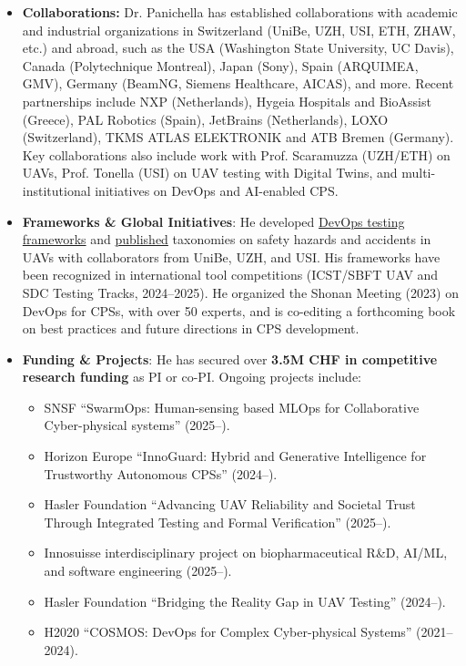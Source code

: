 \documentclass[11pt]{article}
\begin{document}
\begin{itemize}
\vspace{-2.5mm}
\item 
\textbf{Collaborations:} 
Dr. Panichella has established collaborations with academic and industrial organizations in Switzerland (UniBe, UZH, USI, ETH, ZHAW, etc.) and abroad, such as the USA (Washington State University, UC Davis), Canada (Polytechnique Montreal), Japan (Sony), Spain (ARQUIMEA, GMV), Germany (BeamNG, Siemens Healthcare, AICAS), and more. 
Recent partnerships include NXP (Netherlands), Hygeia Hospitals and BioAssist (Greece), PAL Robotics (Spain), JetBrains (Netherlands), LOXO (Switzerland), TKMS ATLAS ELEKTRONIK and ATB Bremen (Germany). 
Key collaborations also include work with Prof. Scaramuzza (UZH/ETH) on UAVs, Prof. Tonella (USI) on UAV testing with Digital Twins, and multi-institutional initiatives on DevOps and AI-enabled CPS.  
\vspace{-2.5mm}
\item   \textbf{Frameworks \& Global Initiatives}:  He developed \href{https://spanichella.github.io/tools.html}{DevOps testing frameworks} and \href{https://spanichella.github.io/publications.html}{published} taxonomies on safety hazards and accidents in UAVs with collaborators from UniBe, UZH, and USI. His frameworks have been recognized in international tool competitions (ICST/SBFT UAV and SDC Testing Tracks, 2024–2025). 
He organized the Shonan Meeting (2023) on DevOps for CPSs, with over 50 experts, and is co-editing a forthcoming book on best practices and future directions in CPS development. 
\vspace{-2.5mm}
\item   \textbf{Funding \& Projects}: He has secured over \textbf{3.5M CHF in competitive research funding} as PI or co-PI. Ongoing projects include:
\begin{itemize}
   \item SNSF “SwarmOps: Human-sensing based MLOps for Collaborative Cyber-physical systems” (2025–).
   \item Horizon Europe “InnoGuard: Hybrid and Generative Intelligence for Trustworthy Autonomous CPSs” (2024–).
   \item Hasler Foundation “Advancing UAV Reliability and Societal Trust Through Integrated Testing and Formal Verification” (2025–).
   \item Innosuisse interdisciplinary project on biopharmaceutical R\&D, AI/ML, and software engineering (2025–).
   \item Hasler Foundation “Bridging the Reality Gap in UAV Testing” (2024–).
   \item H2020 “COSMOS: DevOps for Complex Cyber-physical Systems” (2021–2024).
\end{itemize}
\end{itemize}
\end{document}
